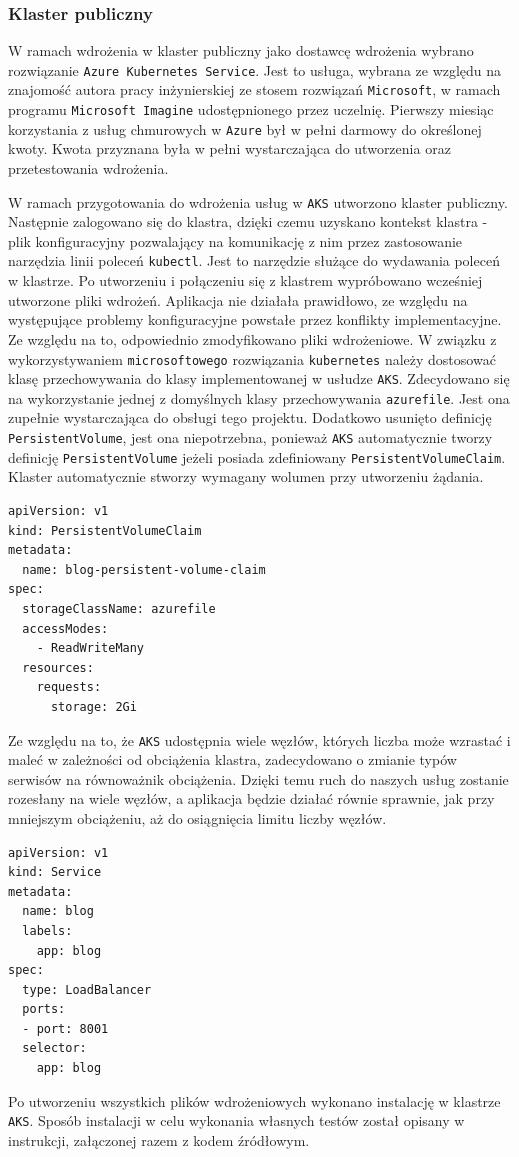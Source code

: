 \documentclass[12pt,twoside]{article}
\begin{document}
\subsubsection{Klaster publiczny}

W ramach wdrożenia w klaster publiczny jako dostawcę wdrożenia wybrano rozwiązanie \texttt{Azure Kubernetes Service}. Jest to usługa, wybrana ze względu na znajomość autora pracy inżynierskiej ze stosem rozwiązań \texttt{Microsoft}, w ramach programu \texttt{Microsoft Imagine} udostępnionego przez uczelnię. Pierwszy miesiąc korzystania z usług chmurowych w \texttt{Azure} był w pełni darmowy do określonej kwoty. Kwota przyznana była w pełni wystarczająca do utworzenia oraz przetestowania wdrożenia.

W ramach przygotowania do wdrożenia usług w \texttt{AKS} utworzono klaster publiczny. Następnie zalogowano się do klastra, dzięki czemu uzyskano kontekst klastra - plik konfiguracyjny pozwalający na komunikację z nim przez zastosowanie narzędzia linii poleceń \texttt{kubectl}. Jest to narzędzie służące do wydawania poleceń w klastrze. Po utworzeniu i połączeniu się z klastrem wypróbowano wcześniej utworzone pliki wdrożeń. Aplikacja nie działała prawidłowo, ze względu na występujące problemy konfiguracyjne powstałe przez konflikty implementacyjne. Ze względu na to, odpowiednio zmodyfikowano pliki wdrożeniowe.
W związku z wykorzystywaniem \texttt{microsoftowego} rozwiązania \texttt{kubernetes} należy dostosować klasę przechowywania do klasy implementowanej w usłudze \texttt{AKS}. Zdecydowano się na wykorzystanie jednej z domyślnych klasy przechowywania \texttt{azurefile}. Jest ona zupełnie wystarczająca do obsługi tego projektu. Dodatkowo usunięto definicję \texttt{PersistentVolume}, jest ona niepotrzebna, ponieważ \texttt{AKS} automatycznie tworzy definicję \texttt{PersistentVolume} jeżeli posiada zdefiniowany \texttt{PersistentVolumeClaim}. Klaster automatycznie stworzy wymagany wolumen przy utworzeniu żądania.
  \begin{lstlisting}
apiVersion: v1
kind: PersistentVolumeClaim
metadata:
  name: blog-persistent-volume-claim
spec:
  storageClassName: azurefile
  accessModes:
    - ReadWriteMany
  resources:
    requests:
      storage: 2Gi
 \end{lstlisting}
Ze względu na to, że \texttt{AKS} udostępnia wiele węzłów, których liczba może wzrastać i maleć w zależności od obciążenia klastra, zadecydowano o zmianie typów serwisów na równoważnik obciążenia. Dzięki temu ruch do naszych usług zostanie rozesłany na wiele węzłów, a aplikacja będzie działać równie sprawnie, jak przy mniejszym obciążeniu, aż do osiągnięcia limitu liczby węzłów.
\begin{lstlisting}
apiVersion: v1
kind: Service
metadata:
  name: blog
  labels:
    app: blog
spec:
  type: LoadBalancer
  ports:
  - port: 8001
  selector:
    app: blog
 \end{lstlisting}
Po utworzeniu wszystkich plików wdrożeniowych wykonano instalację w klastrze \texttt{AKS}. Sposób instalacji w celu wykonania własnych testów został opisany w instrukcji, załączonej razem z kodem źródłowym.
\end{document}
